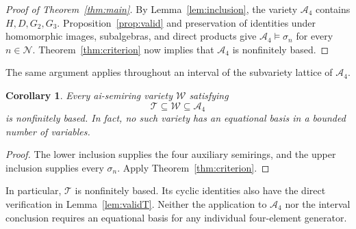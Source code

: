 \documentclass[11pt,reqno]{amsart}
\newtheorem{corollary}[theorem]{Corollary}
\theoremstyle{remark}
\newcommand{\A}{\mathcal A_4}
\newcommand{\T}{\mathcal T}
\newcommand{\Ncal}{\mathcal N}
\numberwithin{equation}{section}
\begin{document}
\begin{proof}[Proof of Theorem~\ref{thm:main}]
By Lemma~\ref{lem:inclusion}, the variety $\A$ contains $H,D,G_2,G_3$.
Proposition~\ref{prop:valid} and preservation of identities under
homomorphic images, subalgebras, and direct products give
$\A\models\sigma_n$ for every $n\in\Ncal$.
Theorem~\ref{thm:criterion} now implies that $\A$ is nonfinitely based.
\end{proof}

The same argument applies throughout an interval of the subvariety
lattice of $\A$.

\begin{corollary}\label{cor:interval}
Every ai-semiring variety $\mathcal W$ satisfying
\[
\T\subseteq\mathcal W\subseteq\A
\]
is nonfinitely based. In fact, no such variety has an equational basis in
a bounded number of variables.
\end{corollary}
\begin{proof}
The lower inclusion supplies the four auxiliary semirings, and the upper
inclusion supplies every $\sigma_n$. Apply Theorem~\ref{thm:criterion}.
\end{proof}

In particular, $\T$ is nonfinitely based. Its cyclic identities also have
the direct verification in Lemma~\ref{lem:validT}. Neither the application
to $\A$ nor the interval conclusion requires an equational basis for any
individual four-element generator.
\end{document}
